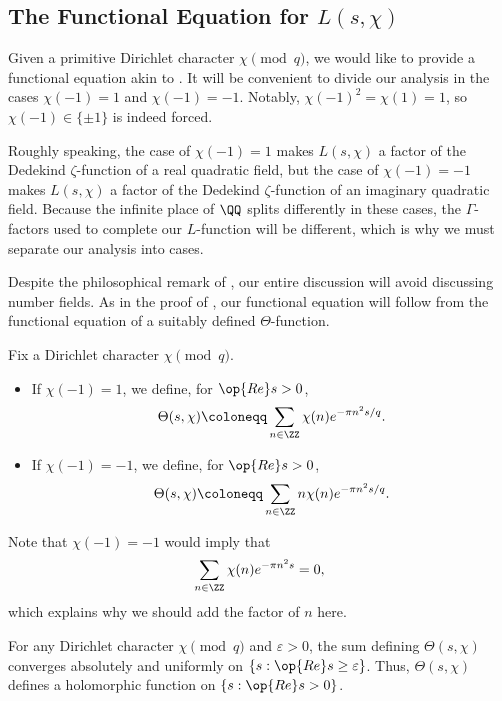 \documentclass[../notes.tex]{subfiles}
\begin{document}
\subsection{The Functional Equation for \texorpdfstring{$L(s,\chi)$}{ L(s, chi)}}
Given a primitive Dirichlet character $\chi\pmod q$, we would like to provide a functional equation akin to . It will be convenient to divide our analysis in the cases $\chi(-1)=1$ and $\chi(-1)=-1$. Notably, $\chi(-1)^2=\chi(1)=1$, so $\chi(-1)\in\{\pm1\}$ is indeed forced.
\begin{remark} \label{rem:why-sign-chi}
	Roughly speaking, the case of $\chi(-1)=1$ makes $L(s,\chi)$ a factor of the Dedekind $\zeta$-function of a real quadratic field, but the case of $\chi(-1)=-1$ makes $L(s,\chi)$ a factor of the Dedekind $\zeta$-function of an imaginary quadratic field. Because the infinite place of $\QQ$ splits differently in these cases, the $\Gamma$-factors used to complete our $L$-function will be different, which is why we must separate our analysis into cases.
\end{remark}
Despite the philosophical remark of , our entire discussion will avoid discussing number fields. As in the proof of , our functional equation will follow from the functional equation of a suitably defined $\Theta$-function.
\begin{definition}
	Fix a Dirichlet character $\chi\pmod q$.
	\begin{itemize}
		\item If $\chi(-1)=1$, we define, for $\op{Re}s>0$,
		\[\Theta(s,\chi)\coloneqq\sum_{n\in\ZZ}\chi(n)e^{-\pi n^2s/q}.\]
		\item If $\chi(-1)=-1$, we define, for $\op{Re}s>0$,
		\[\Theta(s,\chi)\coloneqq\sum_{n\in\ZZ}n\chi(n)e^{-\pi n^2s/q}.\]
	\end{itemize}
\end{definition}
Note that $\chi(-1)=-1$ would imply that
\[\sum_{n\in\ZZ}\chi(n)e^{-\pi n^2s}=0,\]
which explains why we should add the factor of $n$ here.
\begin{lemma}
	For any Dirichlet character $\chi\pmod q$ and $\varepsilon>0$, the sum defining $\Theta(s,\chi)$ converges absolutely and uniformly on $\{s:\op{Re}s\ge\varepsilon\}$. Thus, $\Theta(s,\chi)$ defines a holomorphic function on $\{s:\op{Re}s>0\}$.
\end{lemma}
\end{document}
